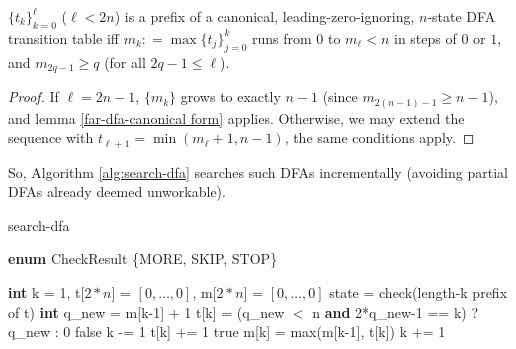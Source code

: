 \begin{corollary}\normalfont
  $\{t_k\}_{k=0}^\ell$ ($\ell<2n$) is a prefix of a canonical, leading-zero-ignoring, $n$-state DFA transition table iff
  $m_k \mathrel{\mathop:}= \max\{t_j\}_{j=0}^k$ runs from $0$ to $m_\ell<n$ in steps of $0$ or $1$, and $m_{2q-1}\ge q$ (for all $2q - 1 \le \ell$).
\end{corollary}
\begin{proof}
  If $\ell=2n-1$, $\{m_k\}$ grows to exactly $n-1$ (since $m_{2(n-1)-1}\ge n-1$), and lemma \ref{far-dfa-canonical form} applies.
  Otherwise, we may extend the sequence with $t_{\ell+1}=\min(m_\ell+1,n-1)$, the same conditions apply.
\end{proof}

So, Algorithm \ref{alg:search-dfa} searches such DFAs incrementally (avoiding partial DFAs already deemed unworkable).

\begin{algorithm}
  \caption{{\sc search-dfa}}\label{alg:search-dfa}

  \begin{algorithmic}[1]
    \State \textbf{enum} CheckResult \{MORE, SKIP, STOP\}
    \Statex

    \State \textbf{int} k = 1, t[$2*n$] = $[0,\ldots,0]$, m[$2*n$] = $[0,\ldots,0]$
    \Loop
    \State state = check(length-k prefix of t)
    \State \textbf{int} q\_new = m[k-1] + 1
    \State t[k] = (q\_new $<$ \textrm{n} \textbf{and} 2*q\_new-1 == k) ? q\_new : 0
    \Repeat
    \Return false
    \EndIf
    \State k -= 1
    \State t[k] += 1
    \Else\;\Return true
    \EndIf
    \State m[k] = max(m[k-1], t[k])
    \State k += 1
    \EndLoop
    \EndProcedure

  \end{algorithmic}
\end{algorithm}



